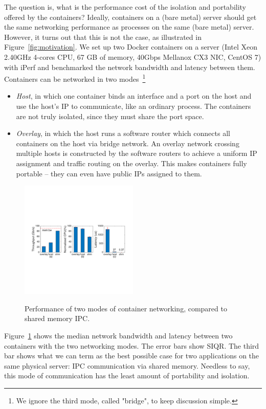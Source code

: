The question is, what is the performance cost of the isolation and portability
offered by the containers? Ideally, containers on a (bare metal) server should
get the same networking performance as processes on the same (bare metal)
server. However, it turns out that this is not the case, as illustrated in
Figure~\ref{fig:motivation}.  We set up two Docker
containers on a server (Intel Xeon 2.40GHz 4-cores CPU, 67 GB of memory, 40Gbps Mellanox CX3 NIC, CentOS 7) with iPerf and benchmarked the network bandwidth and latency between
them. Containers can be networked in two modes~\footnote{We ignore the third
mode, called "bridge", to keep discussion simple.} 
\begin{itemize}
\item {\em Host}, in which one container binds an interface and a port on the
    host and use the host's IP to communicate, like an ordinary process. The
    containers are not truly isolated, since they must share the port space.
\item {\em Overlay}, in which the host runs a software router which connects
    all containers on the host via bridge network. An overlay network crossing
    multiple hosts is constructed by the software routers to achieve a uniform
    IP assignment and traffic routing on the overlay. This makes containers
    fully portable -- they can even have public IPs assigned to them.
\end{itemize}

\begin{figure}[ht]
     \centering 
     \includegraphics[width=0.5\textwidth]{figures/intro/intro_exist2.pdf} 
     \label{fig:three_modes}
     \caption{Performance of two modes of container networking, compared to
     shared memory IPC.} 
\end{figure} 

Figure~\ref{fig:three_modes} shows the median network bandwidth and latency
between two containers with the two networking modes. The error bars show SIQR.
The third bar shows what we can term as the best possible case for two
applications on the same physical server: IPC communication via shared memory.
Needless to say, this mode of communication has the least amount of portability
and isolation.

